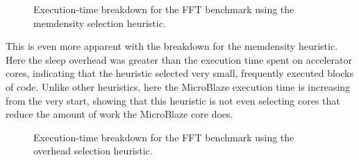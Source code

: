 \documentclass{UoYCSproject}
\begin{document}
\begin{figure}[H]
\caption{Execution-time breakdown for the FFT benchmark using the memdensity selection heuristic.}
\label{fig:breakdownMemDensityFFT}
\end{figure}

This is even more apparent with the breakdown for the memdensity heuristic. Here the sleep overhead was greater than the
execution time spent on accelerator cores, indicating that the heuristic selected very small, frequently executed blocks of code.
Unlike other heuristics, here the MicroBlaze execution time is increasing from the very start, showing that this heuristic
is not even selecting cores that reduce the amount of work the MicroBlaze core does.

\begin{figure}[H]
\caption{Execution-time breakdown for the FFT benchmark using the overhead selection heuristic.}
\label{fig:breakdowOverheadFFT}
\end{figure}
\end{document}
